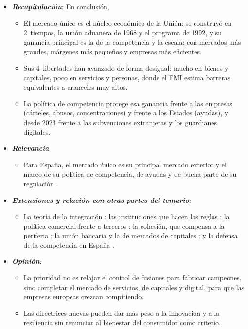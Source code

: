\documentclass[11pt]{article}
\begin{document}
\begin{itemize}
\item \textbf{\emph{Recapitulación}}: En conclusión,
  \begin{itemize}
  \item El mercado único es el núcleo económico de la Unión: se construyó en 2~tiempos, la unión aduanera de 1968 y el programa de 1992, y su ganancia principal es la de la competencia y la escala: con mercados más grandes, márgenes más pequeños y empresas más eficientes.
  \item Sus 4~libertades han avanzado de forma desigual: mucho en bienes y capitales, poco en servicios y personas, donde el FMI estima barreras equivalentes a aranceles muy altos.
  \item La política de competencia protege esa ganancia frente a las empresas (cárteles, abusos, concentraciones) y frente a los Estados (ayudas), y desde 2023 frente a las subvenciones extranjeras y los guardianes digitales.
  \end{itemize}
\item \textbf{\emph{Relevancia}}:
  \begin{itemize}
  \item Para España, el mercado único es su principal mercado exterior y el marco de su política de competencia, de ayudas y de buena parte de su regulación  .
  \end{itemize}
\item \textbf{\emph{Extensiones y relación con otras partes del temario}}:
  \begin{itemize}
  \item La teoría de la integración ; las instituciones que hacen las reglas ; la política comercial frente a terceros ; la cohesión, que compensa a la periferia ; la unión bancaria y la de mercados de capitales ; y la defensa de la competencia en España .
  \end{itemize}
\item \textbf{\emph{Opinión}}:
  \begin{itemize}
  \item La prioridad no es relajar el control de fusiones para fabricar campeones, sino completar el mercado de servicios, de capitales y digital, para que las empresas europeas crezcan compitiendo.

  \item Las directrices nuevas pueden dar más peso a la innovación y a la resiliencia sin renunciar al bienestar del consumidor como criterio.


\end{itemize}
\end{itemize}
\end{document}
